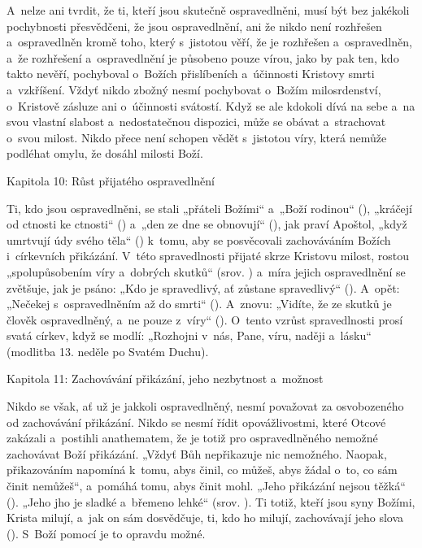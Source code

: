 A~nelze ani tvrdit, že ti, kteří jsou skutečně ospravedlněni, musí být bez jakékoli
pochybnosti přesvědčeni, že jsou ospravedlnění, ani že nikdo není rozhřešen a~ospravedlněn
kromě toho, který s~jistotou věří, že je rozhřešen a~ospravedlněn, a~že rozhřešení
a~ospravedlnění je působeno pouze vírou, jako by pak ten, kdo takto nevěří, pochyboval
o~Božích přislíbeních a~účinnosti Kristovy smrti a~vzkříšení. Vždyť nikdo zbožný
nesmí pochybovat o~Božím milosrdenství, o~Kristově zásluze ani o~účinnosti svátostí.
Když se ale kdokoli dívá na sebe a~na svou vlastní slabost a~nedostatečnou dispozici,
může se obávat a~strachovat o~svou milost. Nikdo přece není schopen vědět s~jistotou
víry, která nemůže podléhat omylu, že dosáhl milosti Boží.

\chaptitle
Kapitola 10:
Růst přijatého ospravedlnění

Ti, kdo jsou ospravedlněni, se stali „přáteli Božími“ a~„Boží rodinou“ (), „kráčejí od ctnosti ke ctnosti“ () a~„den ze dne se obnovují“
(), jak praví Apoštol, „když umrtvují údy svého těla“ () k~tomu,
aby se posvěcovali zachováváním Božích i~církevních přikázání. V~této spravedlnosti
přijaté skrze Kristovu milost, rostou „spolupůsobením víry a~dobrých skutků“ (srov.
) a~míra jejich ospravedlnění se zvětšuje, jak je psáno: „Kdo je spravedlivý,
ať zůstane spravedlivý“ (). A~opět: „Nečekej s~ospravedlněním až do smrti“
(). A~znovu: „Vidíte, že ze skutků je člověk ospravedlněný, a~ne pouze
z~víry“ (). O~tento vzrůst spravedlnosti prosí svatá církev, když se modlí:
„Rozhojni v~nás, Pane, víru, naději a~lásku“ (modlitba 13. neděle po Svatém Duchu).

\chaptitle
Kapitola 11:
Zachovávání přikázání, jeho nezbytnost a~možnost

Nikdo se však, ať už je jakkoli ospravedlněný, nesmí považovat za osvobozeného od
zachovávání přikázání. Nikdo se nesmí řídit opovážlivostmi, které Otcové zakázali
a~postihli anathematem, že je totiž pro ospravedlněného nemožné zachovávat Boží přikázání.
„Vždyť Bůh nepřikazuje nic nemožného. Naopak, přikazováním napomíná k~tomu, abys
činil, co můžeš, abys žádal o~to, co sám činit nemůžeš“, a~pomáhá tomu, abys činit
mohl. „Jeho přikázání nejsou těžká“ (). „Jeho jho je sladké a~břemeno lehké“
(srov. ). Ti totiž, kteří jsou  syny Božími, Krista milují, a~jak on sám
dosvědčuje, ti, kdo ho milují, zachovávají jeho slova (). S~Boží pomocí
je to opravdu možné.

